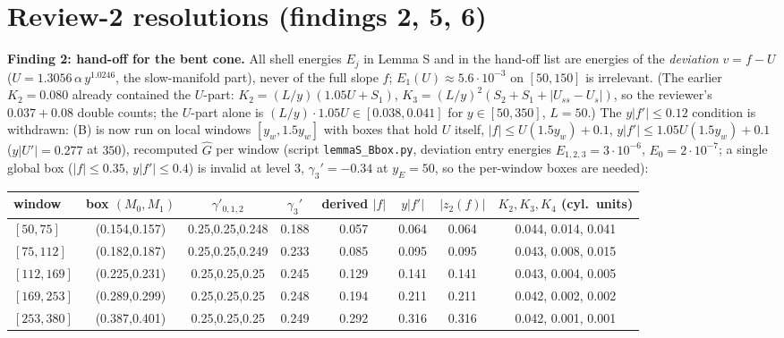 \documentclass[11pt]{article}
\begin{document}
\section*{Review-2 resolutions (findings 2, 5, 6)}
\small
\textbf{Finding 2: hand-off for the bent cone.} All shell energies $E_j$ in Lemma S and in the hand-off list are energies of the \emph{deviation} $v=f-U$ ($U=1.3056\,\alpha\,y^{1.0246}$, the slow-manifold part), never of the full slope $f$; $E_1(U)\approx5.6\cdot10^{-3}$ on $[50,150]$ is irrelevant. (The earlier $K_2=0.080$ already contained the $U$-part: $K_2=(L/y)(1.05U+S_1)$, $K_3=(L/y)^2(S_2+S_1+|U_{ss}-U_s|)$, so the reviewer's $0.037+0.08$ double counts; the $U$-part alone is $(L/y)\cdot1.05U\in[0.038,0.041]$ for $y\in[50,350]$, $L=50$.) The $y|f'|\le0.12$ condition is withdrawn: (B) is now run on local windows $[y_w,1.5y_w]$ with boxes that hold $U$ itself, $|f|\le U(1.5y_w)+0.1$, $y|f'|\le1.05U(1.5y_w)+0.1$ ($y|U'|=0.277$ at $350$), recomputed $\hat G$ per window (script \texttt{lemmaS\_Bbox.py}, deviation entry energies $E_{1,2,3}=3\cdot10^{-6}$, $E_0=2\cdot10^{-7}$; a single global box ($|f|\le0.35$, $y|f'|\le0.4$) is invalid at level 3, $\gamma_3'=-0.34$ at $y_E=50$, so the per-window boxes are needed):
\begin{center}\scriptsize\begin{tabular}{lccccccc}
window & box $(M_0,M_1)$ & $\gamma'_{0,1,2}$ & $\gamma_3'$ & derived $|f|$ & $y|f'|$ & $|z_2(f)|$ & $K_2,K_3,K_4$ (cyl.\ units)\\\hline
$[50,75]$ & (0.154,0.157) & 0.25,0.25,0.248 & 0.188 & 0.057 & 0.064 & 0.064 & 0.044, 0.014, 0.041\\
$[75,112]$ & (0.182,0.187) & 0.25,0.25,0.249 & 0.233 & 0.085 & 0.095 & 0.095 & 0.043, 0.008, 0.015\\
$[112,169]$ & (0.225,0.231) & 0.25,0.25,0.25 & 0.245 & 0.129 & 0.141 & 0.141 & 0.043, 0.004, 0.005\\
$[169,253]$ & (0.289,0.299) & 0.25,0.25,0.25 & 0.248 & 0.194 & 0.211 & 0.211 & 0.042, 0.002, 0.002\\
$[253,380]$ & (0.387,0.401) & 0.25,0.25,0.25 & 0.249 & 0.292 & 0.316 & 0.316 & 0.042, 0.001, 0.001
\end{tabular}\end{center}
\end{document}
